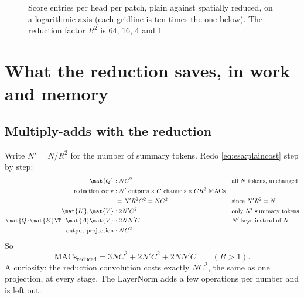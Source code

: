 \begin{figure}[htbp]
\centering
{}
\caption{Score entries per head per patch, plain against spatially reduced, on a logarithmic axis
(each gridline is ten times the one below). The reduction factor $R^2$ is 64, 16, 4 and 1.}
\label{fig:esa:scorebars}
\end{figure}

\section{What the reduction saves, in work and memory}\label{sec:esa:savings}

\subsection{Multiply-adds with the reduction}

Write $N' = N/R^2$ for the number of summary tokens. Redo \cref{eq:esa:plaincost} step by step:
\begin{align*}
  \mat{Q} &: NC^2 && \text{all } N \text{ tokens, unchanged}\\
  \text{reduction conv} &: N' \text{ outputs} \times C \text{ channels} \times C R^2 \text{ MACs}\\
  &\phantom{:} = N'R^2C^2 = NC^2 && \text{since } N'R^2 = N\\
  \mat{K}, \mat{V} &: 2N'C^2 && \text{only } N' \text{ summary tokens}\\
  \mat{Q}\mat{K}\T,\ \mat{A}\mat{V} &: 2NN'C && N' \text{ keys instead of } N\\
  \text{output projection} &: NC^2 .
\end{align*}
So
\begin{equation}\label{eq:esa:redcost}
  \text{MACs}_\text{reduced} = 3NC^2 + 2N'C^2 + 2NN'C \qquad (R > 1).
\end{equation}
A curiosity: the reduction convolution costs exactly $NC^2$, the same as one projection, at every
stage. The LayerNorm adds a few operations per number and is left out.

